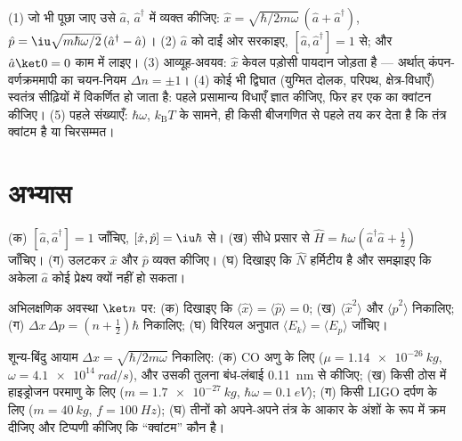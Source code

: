 \begin{method}[दोलक-बीजगणित]\label{met:b3:harmonic-oscillator:method}
(1) जो भी पूछा जाए उसे $\hat a$, $\hat a^\dagger$ में व्यक्त कीजिए: $\hat x
= \sqrt{\hbar/2m\omega}\,(\hat a + \hat a^\dagger)$, $\hat p =
\iu\sqrt{m\hbar\omega/2}\,(\hat a^\dagger - \hat a)$। (2)
$\hat a$ को दाईं ओर सरकाइए, $[\hat a, \hat a^\dagger] = 1$ से; और
$\hat a\ket0 = 0$ काम में लाइए। (3) आव्यूह-अवयव: $\hat x$ केवल
पड़ोसी पायदान जोड़ता है --- अर्थात् कंपन-वर्णक्रममापी का चयन-नियम
$\Delta n = \pm1$। (4) कोई भी द्विघात  (युग्मित
दोलक, परिपथ, क्षेत्र-विधाएँ) स्वतंत्र सीढ़ियों में विकर्णित हो जाता है:
पहले प्रसामान्य विधाएँ ज्ञात कीजिए, फिर हर एक का क्वांटन कीजिए। (5) पहले
संख्याएँ: $\hbar\omega$, $k_{\text{B}}T$ के सामने, ही किसी बीजगणित से
पहले तय कर देता है कि तंत्र क्वांटम है या चिरसम्मत।
\end{method}

\section{अभ्यास}

\begin{exercise}[$\star$]\label{exo:b3:harmonic-oscillator:1}
(क) $[\hat a, \hat a^\dagger] = 1$ जाँचिए, $[\hat x, \hat p] =
\iu\hbar$ से। (ख) सीधे प्रसार से $\hat H = \hbar\omega(\hat a^\dagger\hat a +
\tfrac12)$ जाँचिए। (ग) उलटकर $\hat x$ और
$\hat p$ व्यक्त कीजिए। (घ) दिखाइए कि $\hat N$ हर्मिटीय है और समझाइए
कि अकेला $\hat a$ कोई प्रेक्ष्य क्यों नहीं हो सकता।
\end{exercise}

\begin{exercise}[$\star$]\label{exo:b3:harmonic-oscillator:2}
अभिलक्षणिक अवस्था $\ket n$ पर: (क) दिखाइए कि $\langle\hat x\rangle =
\langle\hat p\rangle = 0$; (ख) $\langle\hat x^2\rangle$ और
$\langle\hat p^2\rangle$ निकालिए; (ग) $\Delta x\,\Delta p = (n +
\tfrac12)\hbar$ निकालिए; (घ) विरियल अनुपात $\langle E_k\rangle =
\langle E_p\rangle$ जाँचिए।
\end{exercise}

\begin{exercise}[$\star$]\label{exo:b3:harmonic-oscillator:3}
शून्य-बिंदु आयाम $\Delta x = \sqrt{\hbar/2m\omega}$ निकालिए:
(क) CO अणु के लिए ($\mu = \qty{1.14e-26}{kg}$, $\omega =
\qty{4.1e14}{rad/s}$), और उसकी तुलना बंध-लंबाई
\qty{0.11}{nm} से कीजिए; (ख) किसी ठोस में हाइड्रोजन परमाणु के लिए ($m =
\qty{1.7e-27}{kg}$, $\hbar\omega = \qty{0.1}{eV}$); (ग) किसी LIGO
दर्पण के लिए ($m = \qty{40}{kg}$, $f = \qty{100}{Hz}$); (घ) तीनों को
अपने-अपने तंत्र के आकार के अंशों के रूप में क्रम दीजिए और टिप्पणी
कीजिए कि ``क्वांटम'' कौन है।
\end{exercise}

